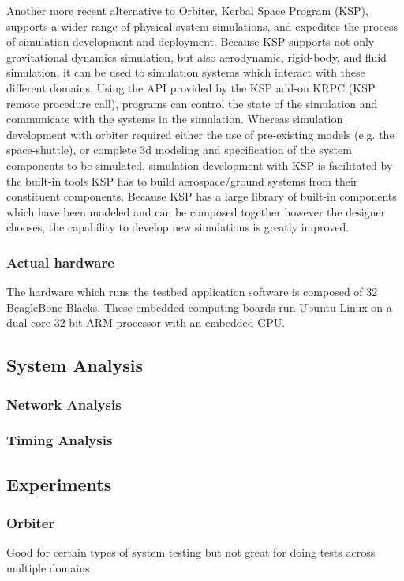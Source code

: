 Another more recent alternative to Orbiter, Kerbal Space Program (KSP), supports a wider range of physical system simulations, and expedites the process of simulation development and deployment.  Because KSP supports not only gravitational dynamics simulation, but also aerodynamic, rigid-body, and fluid simulation, it can be used to simulation systems which interact with these different domains.  Using the API provided by the KSP add-on KRPC (KSP remote procedure call), programs can control the state of the simulation and communicate with the systems in the simulation.  Whereas simulation development with orbiter required either the use of pre-existing models (e.g. the space-shuttle), or complete 3d modeling and specification of the system components to be simulated, simulation development with KSP is facilitated by the built-in tools KSP has to build aerospace/ground systems from their constituent components.  Because KSP has a large library of built-in components which have been modeled and can be composed together however the designer chooses, the capability to develop new simulations is greatly improved.  
\subsubsection{Actual hardware}
The hardware which runs the testbed application software is composed of 32 BeagleBone Blacks.  These embedded computing boards run Ubuntu Linux on a dual-core 32-bit ARM processor with an embedded GPU.  

\subsection{System Analysis}
\subsubsection{Network Analysis}
\subsubsection{Timing Analysis}

\subsection{Experiments}
\subsubsection{Orbiter}
Good for certain types of system testing but not great for doing tests across multiple domains
